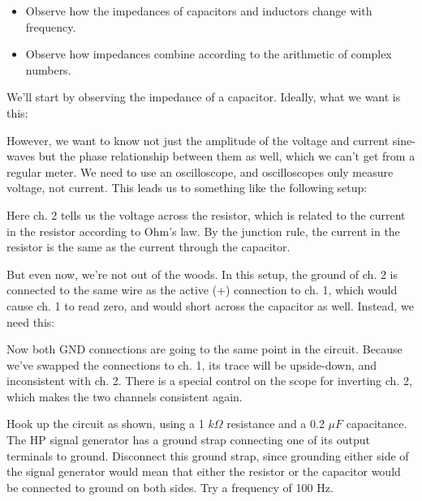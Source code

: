 
\label{lab:impedance}

 
\begin{itemize}
\item[] Observe how the impedances of capacitors and inductors
change with frequency.

\item[] Observe how impedances combine according to the arithmetic of complex numbers.
\end{itemize}

\setup

We'll start by observing the impedance of a capacitor.
Ideally, what we want is this:


However, we want to know not just the amplitude of the
voltage and current sine-waves but the phase relationship
between them as well, which we can't get from a regular
meter. We need to use an oscilloscope, and oscilloscopes only
measure voltage, not current. This leads us to something
like the following setup:


Here ch. 2 tells us the voltage across the resistor, which
is related to the current in the resistor according to Ohm's
law. By the junction rule, the current in the resistor is
the same as the current through the capacitor.

But even now, we're not out of the woods. In this setup, the
ground of ch. 2 is connected to the same wire as the active
(+) connection to ch. 1, which would cause ch. 1 to read
zero, and would short across the capacitor as well.
Instead, we need this:


Now both GND connections are going to the same point in the
circuit. Because we've swapped the connections to ch. 1, its
trace will be upside-down, and inconsistent with ch. 2.
There is a special control on the scope for inverting  ch.
2, which makes the two channels consistent again.

\observations


Hook up the circuit as shown, using a 1 $k\Omega $
resistance and a  0.2 $\mu F$ capacitance. The HP signal
generator has a ground strap connecting one of its output
terminals to ground. Disconnect this ground strap, since
grounding either side of the signal generator would mean
that either the resistor or the capacitor would be connected
to ground on both sides. Try a frequency of 100 Hz.

